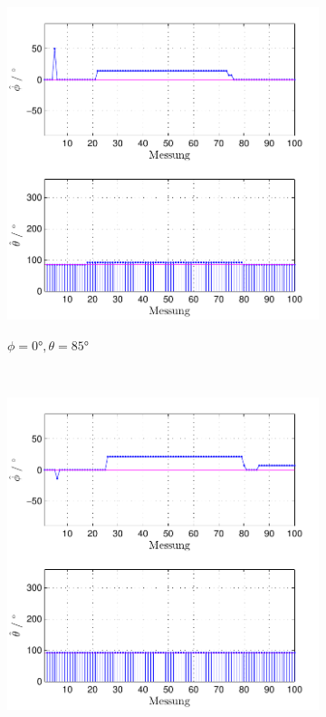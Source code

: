 \begin{figure}
\begin{subfigure}[b]{0.48\textwidth}
                \includegraphics[width=\textwidth]{grafiken/04_Echtzeitversuch/MALE_Phi_0_Theta_85}
                \label{fig:Foto_DSP_Draufsicht}
                \caption{$\phi=0°, \theta = 85°$}
        \end{subfigure}
        ~ %
        \begin{subfigure}[b]{0.48\textwidth}
                \centering
                \includegraphics[width=\textwidth]{grafiken/04_Echtzeitversuch/MALE_Phi_0_Theta_92}

\end{subfigure}
\end{figure}
